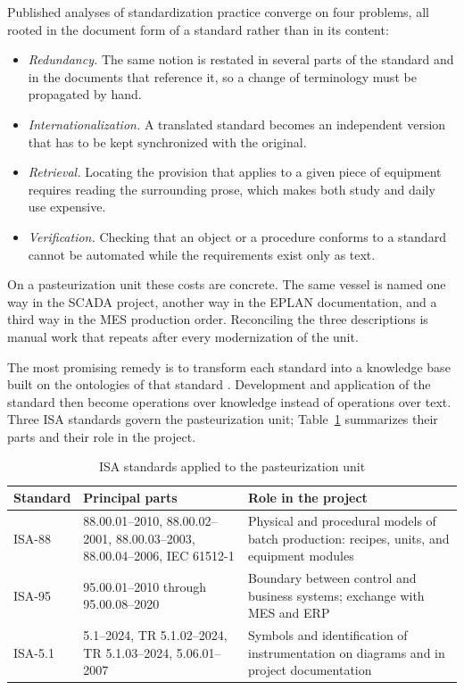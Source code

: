 Published analyses of standardization practice \cite{Serenkov-2004, Uglev-2012}
converge on four problems, all rooted in the document form of a standard rather
than in its content:

\begin{itemize}
  \item \emph{Redundancy.} The same notion is restated in several parts of the
    standard and in the documents that reference it, so a change of terminology
    must be propagated by hand.
  \item \emph{Internationalization.} A translated standard becomes an
    independent version that has to be kept synchronized with the original.
  \item \emph{Retrieval.} Locating the provision that applies to a given piece
    of equipment requires reading the surrounding prose, which makes both study
    and daily use expensive.
  \item \emph{Verification.} Checking that an object or a procedure conforms to
    a standard cannot be automated while the requirements exist only as text.
\end{itemize}

On a pasteurization unit these costs are concrete. The same vessel is named one
way in the SCADA project, another way in the EPLAN documentation, and a third
way in the MES production order. Reconciling the three descriptions is manual
work that repeats after every modernization of the unit.

The most promising remedy is to transform each standard into a knowledge base
built on the ontologies of that standard \cite{Golenkov2019, Serenkov-2004,
Uglev-2012, Improving-2017, ISA-88-formalization}. Development and application
of the standard then become operations over knowledge instead of operations over
text. Three ISA standards govern the pasteurization unit;
Table~\ref{tab:isa_parts} summarizes their parts and their role in the project.

\begin{table}[ht]
  \caption{ISA standards applied to the pasteurization unit}
  \label{tab:isa_parts}
  \centering
  \small
  \begin{tabular}{@{}p{}p{}p{}@{}}
    \hline
    Standard & Principal parts & Role in the project \\
    \hline
    ISA-88 \cite{ISA88} & 88.00.01--2010, 88.00.02--2001, 88.00.03--2003,
    88.00.04--2006, IEC 61512-1 & Physical and procedural models of batch
    production: recipes, units, and equipment modules \\
    ISA-95 \cite{ISA95} & 95.00.01--2010 through 95.00.08--2020 & Boundary
    between control and business systems; exchange with MES and ERP \\
    ISA-5.1 \cite{ISA_5_1} & 5.1--2024, TR 5.1.02--2024, TR 5.1.03--2024,
    5.06.01--2007 & Symbols and identification of instrumentation on diagrams
    and in project documentation \\
    \hline
  \end{tabular}
\end{table}

